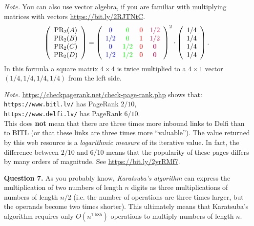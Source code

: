 \documentclass[jou]{apa6}
\begin{document}
\vspace{4pt}
{\em Note.} You can also use vector algebra, if you are 
familiar with multiplying matrices with vectors
\textendash{} \url{https://bit.ly/2RJTNtC}.
$$\left( \begin{array}{c}
\text{PR}_2(A)\\
\text{PR}_2(B)\\
\text{PR}_2(C)\\
\text{PR}_2(D)
\end{array} \right) = \left( 
\begin{array}{cccc}
\textcolor{blue}{0}   & \textcolor{green}{0}   & \textcolor{red}{0} & \textcolor{purple}{1/2} \\
\textcolor{blue}{1/2} & \textcolor{green}{0}   & \textcolor{red}{1} & \textcolor{purple}{1/2} \\
\textcolor{blue}{0}   & \textcolor{green}{1/2} & \textcolor{red}{0} & \textcolor{purple}{0} \\
\textcolor{blue}{1/2} & \textcolor{green}{1/2} & \textcolor{red}{0} & \textcolor{purple}{0}
\end{array} \right)^2 \cdot \left( \begin{array}{c}
1/4 \\
1/4 \\
1/4 \\
1/4
\end{array} \right).$$
In this formula a square matrix $4 \times 4$ is twice multiplied to a $4 \times 1$
vector $(1/4, 1/4, 1/4, 1/4)$ from the left side. 


\vspace{4pt}
{\em Note.} \url{https://checkpagerank.net/check-page-rank.php}
shows that:\\
{\tt https://www.bitl.lv/} has PageRank $2/10$,\\
{\tt https://www.delfi.lv/} has PageRank $6/10$.\\
This does {\bf not} mean that there are three times more 
inbound links to Delfi than to BITL (or that these links are three times more ``valuable''). 
The value returned by this web resource is a {\em logarithmic measure}
of its iterative value. In fact, the difference between $2/10$ and $6/10$
means that the popularity of these pages differs by many orders of magnitude. 
See \url{https://bit.ly/2yrRMf7}.


\vspace{10pt}
{\bf Question 7.} As you probably know, {\em Karatsuba's algorithm} can express 
the multiplication of two numbers of length $n$ digits as 
three multiplications of numbers of length $n/2$ (i.e. the number of 
operations are three times larger, but the operands become two times shorter). 
This ultimately means that Karatsuba's algorithm requires
only $O(n^{1.585})$ operations to multiply numbers of length $n$.
\end{document}
